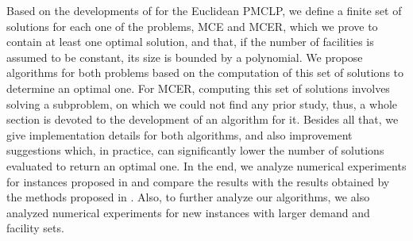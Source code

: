 Based on the developments of \cite{church:1984} for the Euclidean PMCLP, we define a finite set of solutions for each one of the problems, MCE and MCER, which we prove to contain at least one optimal solution, and that, if the number of facilities is assumed to be constant, its size is bounded by a polynomial.
We propose algorithms for both problems based on the computation of this set of solutions to determine an optimal one.
For MCER, computing this set of solutions involves solving a subproblem, on which we could not find any prior study, thus, a whole section is devoted to the development of an algorithm for it.
Besides all that, we give implementation details for both algorithms, and also improvement suggestions which, in practice, can significantly lower the number of solutions evaluated to return an optimal one.
In the end, we analyze numerical experiments for instances proposed in \cite{canbolat, andreta} and compare the results with the results obtained by the methods proposed in \cite{andreta}. Also, to further analyze our algorithms, we also analyzed numerical experiments for new instances with larger demand and facility sets.